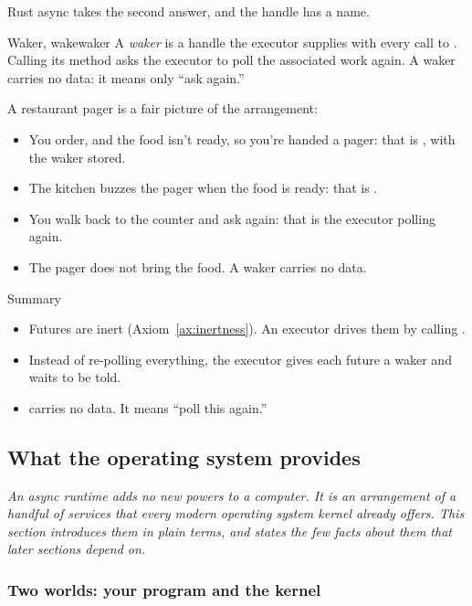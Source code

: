 Rust async takes the second answer, and the handle has a name.

\begin{definition}{Waker, wake}{waker}
    A \emph{waker} is a handle the executor supplies with every call to . Calling its  method asks the executor to poll the associated work again. A waker carries no data: it means only ``ask again.''
\end{definition}

A restaurant pager is a fair picture of the arrangement:

\begin{itemize}
    \item You order, and the food isn't ready, so you're handed a pager: that is , with the waker stored.
    \item The kitchen buzzes the pager when the food is ready: that is .
    \item You walk back to the counter and ask again: that is the executor polling again.
    \item The pager does not bring the food. A waker carries no data.
\end{itemize}

\begin{quotebox}{Summary}
    \begin{itemize}
        \item Futures are inert (Axiom~\ref{ax:inertness}). An executor drives them by calling .
        \item Instead of re-polling everything, the executor gives each future a waker and waits to be told.
        \item {} carries no data. It means ``poll this again.''
    \end{itemize}
\end{quotebox}

\subsection{What the operating system provides}
\label{sec:wakers-ch2}

\textit{An async runtime adds no new powers to a computer. It is an arrangement of a handful of services that every modern operating system kernel already offers. This section introduces them in plain terms, and states the few facts about them that later sections depend on.}

\subsubsection{Two worlds: your program and the kernel}

